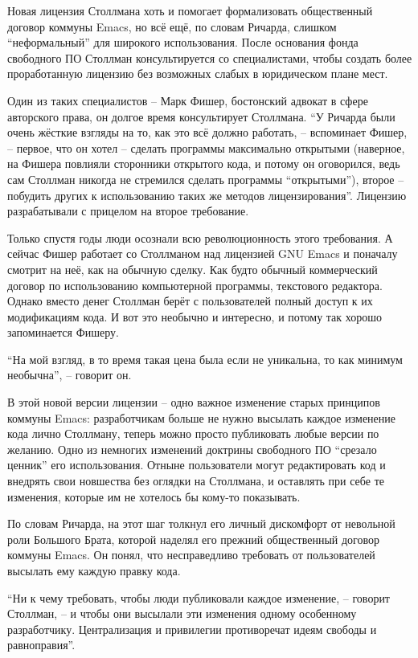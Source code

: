 Новая лицензия Столлмана хоть и помогает формализовать общественный договор коммуны Emacs, но всё ещё, по словам Ричарда, слишком ``неформальный'' для широкого использования. После основания фонда свободного ПО Столлман консультируется со специалистами, чтобы создать более проработанную лицензию без возможных слабых в юридическом плане мест.

Один из таких специалистов -- Марк Фишер, бостонский адвокат в сфере авторского права, он долгое время консультирует Столлмана. ``У Ричарда были очень жёсткие взгляды на то, как это всё должно работать, -- вспоминает Фишер, -- первое, что он хотел -- сделать программы максимально открытыми (наверное, на Фишера повлияли сторонники открытого кода, и потому он оговорился, ведь сам Столлман никогда не стремился сделать программы ``открытыми''), второе -- побудить других к использованию таких же методов лицензирования''. Лицензию разрабатывали с прицелом на второе требование.

Только спустя годы люди осознали всю революционность этого требования. А сейчас Фишер работает со Столлманом над лицензией GNU Emacs и поначалу смотрит на неё, как на обычную сделку. Как будто обычный коммерческий договор по использованию компьютерной программы, текстового редактора. Однако вместо денег Столлман берёт с пользователей полный доступ к их модификациям кода. И вот это необычно и интересно, и потому так хорошо запоминается Фишеру.

``На мой взгляд, в то время такая цена была если не уникальна, то как минимум необычна'', -- говорит он.

В этой новой версии лицензии -- одно важное изменение старых принципов коммуны Emacs: разработчикам больше не нужно высылать каждое изменение кода лично Столлману, теперь можно просто публиковать любые версии по желанию. Одно из немногих изменений доктрины свободного ПО ``срезало ценник'' его использования. Отныне пользователи могут редактировать код и внедрять свои новшества без оглядки на Столлмана, и оставлять при себе те изменения, которые им не хотелось бы кому-то показывать.

По словам Ричарда, на этот шаг толкнул его личный дискомфорт от невольной роли Большого Брата, которой наделял его прежний общественный договор коммуны Emacs. Он понял, что несправедливо требовать от пользователей высылать ему каждую правку кода.

``Ни к чему требовать, чтобы люди публиковали каждое изменение, -- говорит Столлман, -- и чтобы они высылали эти изменения одному особенному разработчику. Централизация и привилегии противоречат идеям свободы и равноправия''.

